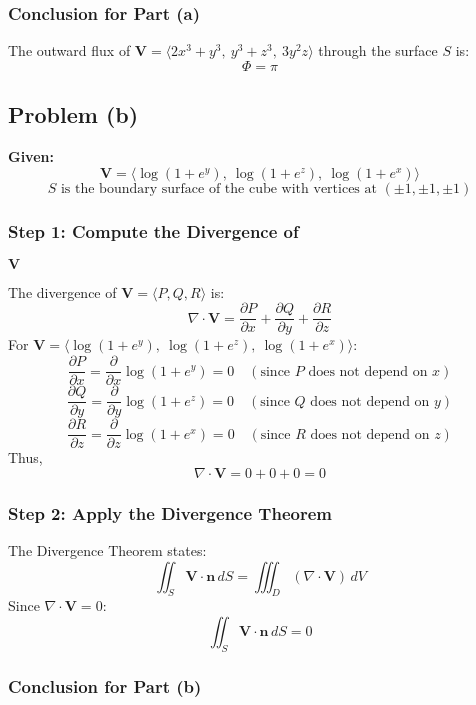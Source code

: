 \documentclass[11pt]{article}
\begin{document}
\subsubsection*{Conclusion for Part (a)}

The outward flux of \( \mathbf{V} = \langle 2x^3 + y^3, \ y^3 + z^3, \ 3y^2 z \rangle \) through the surface \( S \) is:
\[
\boxed{ \Phi = \pi }
\]

\newpage

\subsection{Problem (b)}

\textbf{Given:}
\[
\mathbf{V} = \langle \log(1 + e^y), \ \log(1 + e^z), \ \log(1 + e^x) \rangle
\]
\[
S \text{ is the boundary surface of the cube with vertices at } (\pm 1, \pm 1, \pm 1)
\]

\subsubsection*{Step 1: Compute the Divergence of } $\mathbf{V}$

The divergence of \( \mathbf{V} = \langle P, Q, R \rangle \) is:
\[
\nabla \cdot \mathbf{V} = \frac{\partial P}{\partial x} + \frac{\partial Q}{\partial y} + \frac{\partial R}{\partial z}
\]
For \( \mathbf{V} = \langle \log(1 + e^y), \ \log(1 + e^z), \ \log(1 + e^x) \rangle \):
\[
\frac{\partial P}{\partial x} = \frac{\partial}{\partial x} \log(1 + e^y) = 0 \quad (\text{since } P \text{ does not depend on } x)
\]
\[
\frac{\partial Q}{\partial y} = \frac{\partial}{\partial y} \log(1 + e^z) = 0 \quad (\text{since } Q \text{ does not depend on } y)
\]
\[
\frac{\partial R}{\partial z} = \frac{\partial}{\partial z} \log(1 + e^x) = 0 \quad (\text{since } R \text{ does not depend on } z)
\]
Thus,
\[
\nabla \cdot \mathbf{V} = 0 + 0 + 0 = 0
\]

\subsubsection*{Step 2: Apply the Divergence Theorem}

The Divergence Theorem states:
\[
\iint_{S} \mathbf{V} \cdot \mathbf{n} \, dS = \iiint_{D} (\nabla \cdot \mathbf{V}) \, dV
\]
Since \( \nabla \cdot \mathbf{V} = 0 \):
\[
\iint_{S} \mathbf{V} \cdot \mathbf{n} \, dS = 0
\]

\subsubsection*{Conclusion for Part (b)}
\end{document}
